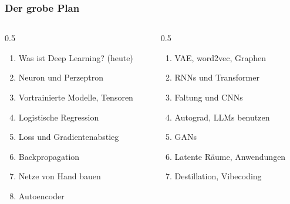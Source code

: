 \begin{frame}
  \frametitle{Der grobe Plan}

  \begin{columns}[t]
    \begin{column}{0.5\textwidth}
      \begin{enumerate}\setlength{\itemsep}{1pt}
      \item Was ist Deep Learning? (heute)
      \item Neuron und Perzeptron
      \item Vortrainierte Modelle, Tensoren
      \item Logistische Regression
      \item Loss und Gradientenabstieg
      \item Backpropagation
      \item Netze von Hand bauen
      \item Autoencoder
      \end{enumerate}
    \end{column}
    \begin{column}{0.5\textwidth}
      \begin{enumerate}\setlength{\itemsep}{1pt}\setcounter{enumi}{8}
      \item VAE, word2vec, Graphen
      \item RNNs und Transformer
      \item Faltung und CNNs
      \item Autograd, LLMs benutzen
      \item GANs
      \item Latente Räume, Anwendungen
      \item Destillation, Vibecoding
      \end{enumerate}
    \end{column}
  \end{columns}

\end{frame}

